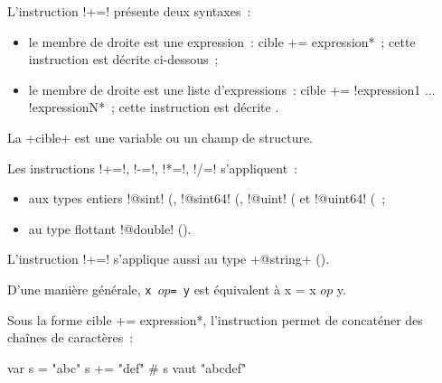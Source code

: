 
L'instruction \ggst!+=! présente deux syntaxes~:
\begin{itemize}
  \item le membre de droite est une expression~: \ggst*cible += expression*~; cette instruction est décrite ci-dessous~;
  \item le membre de droite est une liste d'expressions~: \ggst*cible += !expression1 ... !expressionN*~; cette instruction est décrite .
\end{itemize}

La \ggst+cible+ est une variable ou un champ de structure.

Les instructions \ggst!+=!, \ggst!-=!, \ggst!*=!, \ggst!/=! s'appliquent~:
\begin{itemize}
 \item aux types entiers \ggst!@sint! (, \ggst!@sint64! (, \ggst!@uint! ( et \ggst!@uint64! (~;
 \item au type flottant \ggst!@double! ().
\end{itemize}

L'instruction \ggst!+=! s'applique aussi au type \ggst+@string+ ().

D'une manière générale, \texttt{x $op$= y} est équivalent à {x = x $op$ y}.



Sous la forme \ggst*cible += expression*, l'instruction permet de concaténer des chaînes de caractères~:
\begin{galgas3}
var s = "abc"
s += "def" # s vaut "abcdef"
\end{galgas3}
















